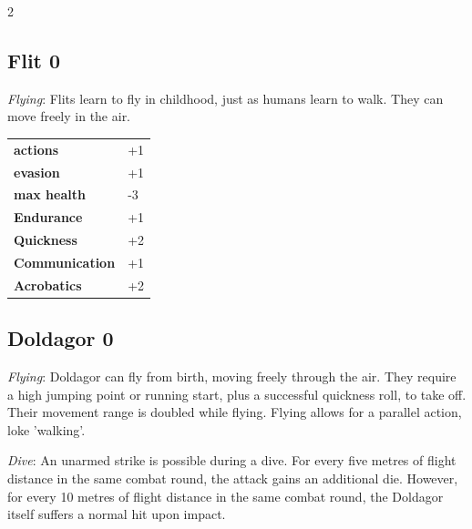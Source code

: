 \begin{multicols}{2}
\begin{tcolorbox}
\end{tcolorbox}

\begin{tcolorbox}
    \subsection*{Flit \hfill \small{0 }}
    \tcblower
\textit{Flying}: Flits learn to fly in childhood, just as humans learn to walk. They can move freely in the air.


\vspace{3mm}

\begin{tabular}{@{}ll@{}}
    \textbf{actions} & +1\\
    \textbf{evasion} & +1\\
    \textbf{max health} & -3\\
    \textbf{Endurance} & +1\\
    \textbf{Quickness} & +2\\
    \textbf{Communication} & +1\\
    \textbf{Acrobatics} & +2\\
\end{tabular}


\end{tcolorbox}

\begin{tcolorbox}
    \subsection*{Doldagor \hfill \small{0 }}
    \tcblower
\textit{Flying}: Doldagor can fly from birth, moving freely through the air. They require a high jumping point or running start, plus a successful quickness roll, to take off. Their movement range is doubled while flying. Flying allows for a parallel action, loke 'walking'.

\textit{Dive}: An unarmed strike is possible during a dive. For every five metres of flight distance in the same combat round, the attack gains an additional die. However, for every 10 metres of flight distance in the same combat round, the Doldagor itself suffers a normal hit upon impact.


\vspace{3mm}


\end{tcolorbox}
\end{multicols}

